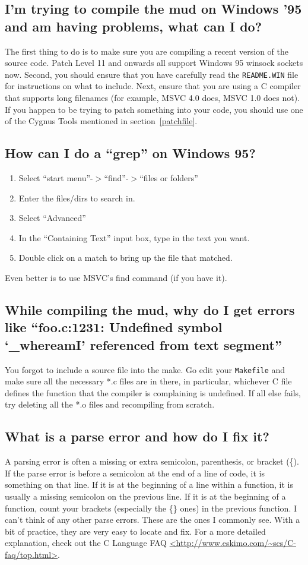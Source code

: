 \documentclass[11pt]{article}
\begin{document}
\subsection{I'm trying to compile the mud on Windows '95 and am having problems, what can I do?}
The first thing to do is to make sure you are compiling a recent version  of the source code.  Patch Level 11 and onwards all support Windows 95 winsock sockets now. Second, you should ensure that you have carefully read the \texttt{README.WIN} file for instructions on what to include.
Next, ensure that you are using a C compiler that supports long filenames (for example, MSVC 4.0 does, MSVC 1.0 does not). If you happen to be trying to patch something into your code, you should use one of the Cygnus Tools mentioned in section~\vref{patchfile}.

\subsection{How can I do a ``grep'' on Windows 95?}
\begin{enumerate}
\item Select ``start menu''-$>$``find''-$>$``files or folders''
\item Enter the files/dirs to search in.
\item Select ``Advanced''
\item In the ``Containing Text'' input box, type in the text you want.
\item Double click on a match to bring up the file that matched. 
\end{enumerate}
Even better is to use MSVC's find command (if you have it).

\subsection{While compiling the mud, why do I get errors like ``foo.c:1231: Undefined symbol `\_whereamI' referenced from text segment''}
You forgot to include a source file into the make.  Go edit your \texttt{Makefile} and make sure all the necessary *.c files are in there, in particular, whichever C file defines the function that the compiler is complaining is undefined.  If all else fails, try deleting all the *.o files and recompiling from scratch. 

\subsection{What is a parse error and how do I fix it?}
A parsing error is often a missing or extra semicolon, parenthesis, or bracket (\{). If the parse error is before a semicolon at the end of a line of code, it is something on that line. If it is at the beginning of a line within a function, it is usually a missing semicolon on the previous line. If it is at the beginning of a function, count your brackets (especially  the \{\} ones) in the previous function. I can't think of any other parse errors.  These are the ones I commonly see.  With a bit of practice, they are very easy to locate and fix.  For a more detailed explanation, check out the C Language FAQ \url{<http://www.eskimo.com/~scs/C-faq/top.html>}.
\end{document}
